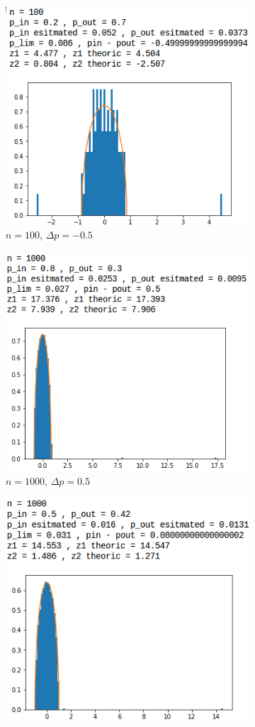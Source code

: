 \begin{figure}[H]
\begin{subfigure}{.5\textwidth}
		\includegraphics[scale=0.58]{static/spectral_n100_pin02_pout07.png}
		\caption{$n=100$, $\Delta p=-0.5$}
	\end{subfigure}
	\begin{subfigure}{.5\textwidth}
		\centering
		\includegraphics[scale=0.58]{static/spectral_n1000_pin08_pout03.png}
		\caption{$n=1000$, $\Delta p=0.5$}
	\end{subfigure}
	\begin{subfigure}{.5\textwidth}
		\centering
		\includegraphics[scale=0.58]{static/spectral_n1000_pin05_pout042.png}

\end{subfigure}
\end{figure}
